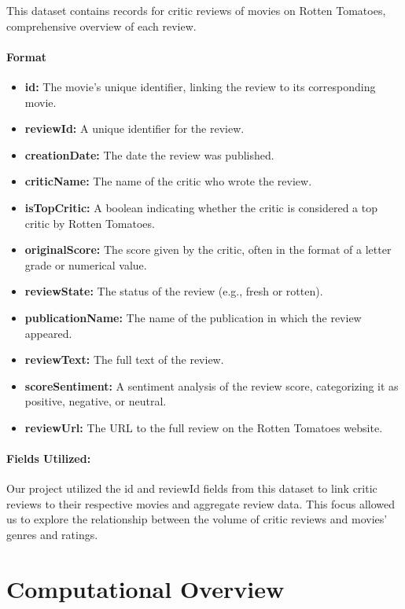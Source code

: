 \documentclass[fontsize=11pt]{article}
\begin{document}
This dataset contains records for critic reviews of movies on Rotten Tomatoes, comprehensive overview of each review.

\paragraph{Format}
\begin{itemize}
    \item \textbf{id:} The movie's unique identifier, linking the review to its corresponding movie.
    \item \textbf{reviewId:} A unique identifier for the review.
    \item \textbf{creationDate:} The date the review was published.
    \item \textbf{criticName:} The name of the critic who wrote the review.
    \item \textbf{isTopCritic:} A boolean indicating whether the critic is considered a top critic by Rotten Tomatoes.
    \item \textbf{originalScore:} The score given by the critic, often in the format of a letter grade or numerical value.
    \item \textbf{reviewState:} The status of the review (e.g., fresh or rotten).
    \item \textbf{publicationName:} The name of the publication in which the review appeared.
    \item \textbf{reviewText:} The full text of the review.
    \item \textbf{scoreSentiment:} A sentiment analysis of the review score, categorizing it as positive, negative, or neutral.
    \item \textbf{reviewUrl:} The URL to the full review on the Rotten Tomatoes website.
\end{itemize}

\paragraph{Fields Utilized:} Our project utilized the id and reviewId fields from this dataset to link critic reviews to their respective movies and aggregate review data. This focus allowed us to explore the relationship between the volume of critic reviews and movies' genres and ratings.

\section*{Computational Overview}
\end{document}
